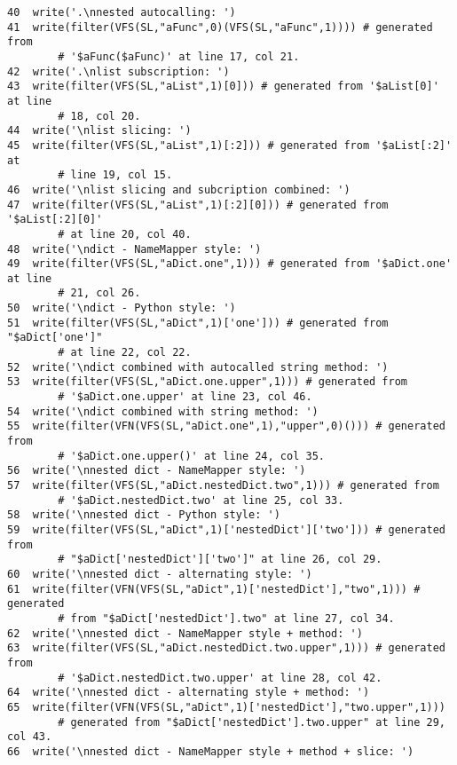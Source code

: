 \begin{verbatim}
40  write('.\nnested autocalling: ')
41  write(filter(VFS(SL,"aFunc",0)(VFS(SL,"aFunc",1)))) # generated from 
        # '$aFunc($aFunc)' at line 17, col 21.
42  write('.\nlist subscription: ')
43  write(filter(VFS(SL,"aList",1)[0])) # generated from '$aList[0]' at line 
        # 18, col 20.
44  write('\nlist slicing: ')
45  write(filter(VFS(SL,"aList",1)[:2])) # generated from '$aList[:2]' at 
        # line 19, col 15.
46  write('\nlist slicing and subcription combined: ')
47  write(filter(VFS(SL,"aList",1)[:2][0])) # generated from '$aList[:2][0]' 
        # at line 20, col 40.
48  write('\ndict - NameMapper style: ')
49  write(filter(VFS(SL,"aDict.one",1))) # generated from '$aDict.one' at line
        # 21, col 26.
50  write('\ndict - Python style: ')
51  write(filter(VFS(SL,"aDict",1)['one'])) # generated from "$aDict['one']" 
        # at line 22, col 22.
52  write('\ndict combined with autocalled string method: ')
53  write(filter(VFS(SL,"aDict.one.upper",1))) # generated from 
        # '$aDict.one.upper' at line 23, col 46.
54  write('\ndict combined with string method: ')
55  write(filter(VFN(VFS(SL,"aDict.one",1),"upper",0)())) # generated from 
        # '$aDict.one.upper()' at line 24, col 35.
56  write('\nnested dict - NameMapper style: ')
57  write(filter(VFS(SL,"aDict.nestedDict.two",1))) # generated from 
        # '$aDict.nestedDict.two' at line 25, col 33.
58  write('\nnested dict - Python style: ')
59  write(filter(VFS(SL,"aDict",1)['nestedDict']['two'])) # generated from 
        # "$aDict['nestedDict']['two']" at line 26, col 29.
60  write('\nnested dict - alternating style: ')
61  write(filter(VFN(VFS(SL,"aDict",1)['nestedDict'],"two",1))) # generated 
        # from "$aDict['nestedDict'].two" at line 27, col 34.
62  write('\nnested dict - NameMapper style + method: ')
63  write(filter(VFS(SL,"aDict.nestedDict.two.upper",1))) # generated from 
        # '$aDict.nestedDict.two.upper' at line 28, col 42.
64  write('\nnested dict - alternating style + method: ')
65  write(filter(VFN(VFS(SL,"aDict",1)['nestedDict'],"two.upper",1))) 
        # generated from "$aDict['nestedDict'].two.upper" at line 29, col 43.
66  write('\nnested dict - NameMapper style + method + slice: ')
\end{verbatim}
